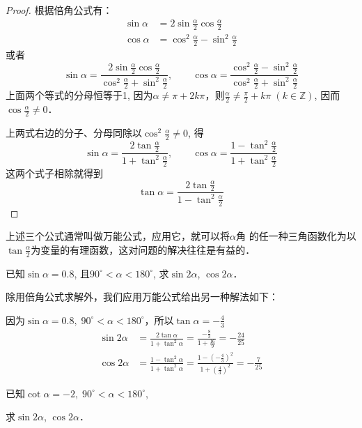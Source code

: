 \begin{proof}
根据倍角公式有：
\[\begin{split}
    \sin\alpha &=2\sin\frac{\alpha}{2}\cos\frac{\alpha}{2}\\
    \cos\alpha &=\cos^2\frac{\alpha}{2}-\sin^2\frac{\alpha}{2}
\end{split}\]
或者
\[\sin\alpha=\frac{2\sin\frac{\alpha}{2}\cos\frac{\alpha}{2}}{\cos^2\frac{\alpha}{2}+\sin^2\frac{\alpha}{2}},\qquad \cos\alpha=\frac{\cos^2\frac{\alpha}{2}-\sin^2\frac{\alpha}{2}}{\cos^2\frac{\alpha}{2}+\sin^2\frac{\alpha}{2}}\]
上面两个等式的分母恒等于1, 因为$\alpha\ne \pi+2k\pi$，则$\frac{\alpha}{2}\ne \frac{\pi}{2}+k\pi\; (k\in\mathbb{Z})$, 因而$\cos\frac{\alpha}{2}\ne 0$．

上两式右边的分子、分母同除以$\cos^2\frac{\alpha}{2}\ne 0$, 得
\[\sin\alpha =\frac{2\tan\frac{\alpha}{2}}{1+\tan^2\frac{\alpha}{2}},\qquad
\cos\alpha=\frac{1-\tan^2\frac{\alpha}{2}}{1+\tan^2\frac{\alpha}{2}}\]
这两个式子相除就得到
\[\tan\alpha=\frac{2\tan\frac{\alpha}{2}}{1-\tan^2\frac{\alpha}{2}}\]
\end{proof}

上述三个公式通常叫做万能公式，应用它，就可以将$\alpha$角
的任一种三角函数化为以$\tan\frac{\alpha}{2}$为变量的有理函数，这对问题的解决往往是有益的．

\begin{example}
已知$\sin\alpha=0.8$, 且$90^{\circ}<\alpha<180^{\circ}$,
求$\sin2\alpha$, $\cos2\alpha$．

\end{example}

\begin{solution}
   除用倍角公式求解外，我们应用万能公式给出另一种解法如下： 

因为$\sin\alpha=0.8,\; 90^{\circ}<\alpha<180^{\circ}$，所以$\tan\alpha=-\frac{4}{3}$
\[\begin{split}
    \sin2\alpha&=\frac{2\tan\alpha}{1+\tan^2\alpha}=\frac{-\frac{8}{3}}{1+\frac{16}{9}}=-\frac{24}{25} \\
    \cos2\alpha&=\frac{1-\tan^2\alpha}{1+\tan^2\alpha}=\frac{1-\left(-\frac{4}{3}\right)^2}{1+\left(\frac{4}{3}\right)^2}=-\frac{7}{25}
\end{split}  \]
\end{solution}


\begin{example}
已知$\cot\alpha=-2,\; 90^{\circ}<\alpha<180^{\circ}$, 

求$\sin2\alpha$, $\cos2\alpha$．
\end{example}

